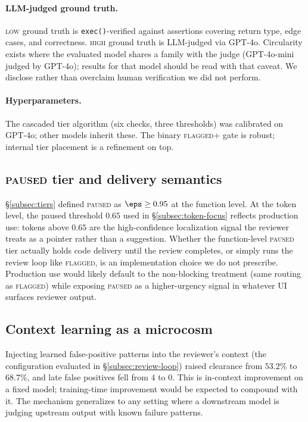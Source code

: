 \paragraph{LLM-judged ground truth.}\label{subsec:gt-disclosure}
\textsc{low} ground truth is \texttt{exec()}-verified against
assertions covering return type, edge cases, and correctness.
\textsc{high} ground truth is LLM-judged via GPT-4o. Circularity
exists where the evaluated model shares a family with the judge
(GPT-4o-mini judged by GPT-4o); results for that model should be
read with that caveat. We disclose rather than overclaim human
verification we did not perform.

\paragraph{Hyperparameters.} The cascaded tier algorithm (six
checks, three thresholds) was calibrated on GPT-4o; other models
inherit these. The binary \textsc{flagged+} gate is robust;
internal tier placement is a refinement on top.

\subsection{\textsc{paused} tier and delivery semantics}
\label{subsec:paused}

\S\ref{subsec:tiers} defined \textsc{paused} as $\eps \ge 0.95$
at the function level. At the token level, the paused threshold
$0.65$ used in \S\ref{subsec:token-focus} reflects production use:
tokens above $0.65$ are the high-confidence localization signal the
reviewer treats as a pointer rather than a suggestion. Whether the
function-level \textsc{paused} tier actually holds code delivery
until the review completes, or simply runs the review loop like
\textsc{flagged}, is an implementation choice we do not prescribe.
Production use would likely default to the non-blocking treatment
(same routing as \textsc{flagged}) while exposing \textsc{paused}
as a higher-urgency signal in whatever UI surfaces reviewer output.

\subsection{Context learning as a microcosm}
\label{subsec:context}

Injecting learned false-positive patterns into the reviewer's
context (the configuration evaluated in \S\ref{subsec:review-loop})
raised clearance from $53.2\%$ to $68.7\%$, and late false positives
fell from $4$ to $0$. This is in-context improvement on a fixed
model; training-time improvement would be expected to compound with
it. The mechanism generalizes to any setting where a downstream
model is judging upstream output with known failure patterns.

